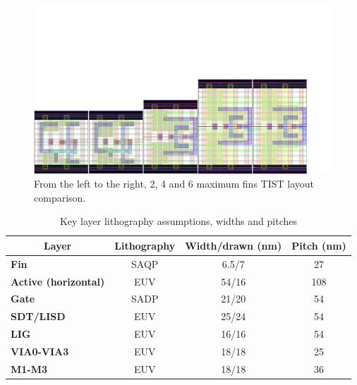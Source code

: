 \documentclass[pgmicro,mestrado,english]{iiufrgs}
\begin{document}
\begin{figure}[]
\centering
\includegraphics[width=\textwidth, trim={0cm 0cm 3cm 8cm},clip]{TISTComp.pdf}
\caption{From the left to the right, 2, 4 and 6 maximum fins TIST layout comparison.}
\label{fig:tistComp}
\end{figure}




\begin{table}[]
\centering
\caption{Key layer lithography assumptions, widths and pitches}
\label{layers}
\begin{tabular}{lccc}
\hline
\multicolumn{1}{c}{\textbf{Layer}} & \textbf{Lithography} & \textbf{Width/drawn (nm)} & \textbf{Pitch (nm)} \\ \hline
\textbf{Fin}                         & SAQP                 & 6.5/7                     & 27                  \\ \hline
\textbf{Active (horizontal)}         & EUV                  & 54/16                     & 108                 \\ \hline
\textbf{Gate}                        & SADP                 & 21/20                     & 54                  \\ \hline
\textbf{SDT/LISD}                    & EUV                  & 25/24                     & 54                  \\ \hline
\textbf{LIG}                         & EUV                  & 16/16                     & 54                  \\ \hline
\textbf{VIA0-VIA3}                   & EUV                  & 18/18                     & 25                  \\ \hline
\textbf{M1-M3}                       & EUV                  & 18/18                     & 36                  \\ \hline
\end{tabular}
\end{table}
\end{document}
